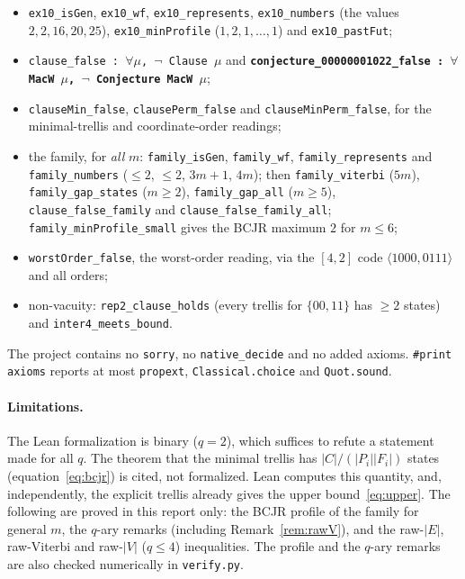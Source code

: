 \documentclass[11pt]{article}
\theoremstyle{definition}
\theoremstyle{remark}
\begin{document}
\begin{itemize}
\item \texttt{ex10\_isGen}, \texttt{ex10\_wf}, \texttt{ex10\_represents},
\texttt{ex10\_numbers} (the values $2,2,16,20,25$), \texttt{ex10\_minProfile}
($1,2,1,\dots,1$) and \texttt{ex10\_pastFut};
\item \texttt{clause\_false : $\forall\mu$, $\neg$ Clause $\mu$} and
\textbf{\texttt{conjecture\_00000001022\_false : $\forall$ MacW $\mu$, $\neg$ Conjecture MacW $\mu$}};
\item \texttt{clauseMin\_false}, \texttt{clausePerm\_false} and
\texttt{clauseMinPerm\_false}, for the minimal-trellis and coordinate-order readings;
\item the family, for \emph{all} $m$: \texttt{family\_isGen}, \texttt{family\_wf},
\texttt{family\_represents} and \texttt{family\_numbers}
($\le2$, $\le2$, $3m+1$, $4m$); then \texttt{family\_viterbi} ($5m$),
\texttt{family\_gap\_states} ($m\ge2$), \texttt{family\_gap\_all} ($m\ge5$),
\texttt{clause\_false\_family} and \texttt{clause\_false\_family\_all};
\texttt{family\_minProfile\_small} gives the BCJR maximum $2$ for $m\le6$;
\item \texttt{worstOrder\_false}, the worst-order reading, via the $[4,2]$ code
$\langle1000,0111\rangle$ and all orders;
\item non-vacuity: \texttt{rep2\_clause\_holds} (every trellis for $\{00,11\}$ has
$\ge2$ states) and \texttt{inter4\_meets\_bound}.
\end{itemize}
The project contains no \texttt{sorry}, no \texttt{native\_decide} and no added axioms.
\texttt{\#print axioms} reports at most \texttt{propext}, \texttt{Classical.choice} and
\texttt{Quot.sound}.

\paragraph{Limitations.} The Lean formalization is binary ($q=2$), which suffices to
refute a statement made for all $q$. The theorem that the minimal trellis has
$|C|/(|P_i||F_i|)$ states (equation~\eqref{eq:bcjr}) is cited, not formalized. Lean
computes this quantity, and, independently, the explicit trellis already gives the
upper bound~\eqref{eq:upper}. The following are proved in this report only: the BCJR profile
of the family for general $m$, the $q$-ary remarks (including Remark~\ref{rem:rawV}), and the
raw-$|E|$, raw-Viterbi and raw-$|V|$ ($q\le4$) inequalities. The profile and the $q$-ary remarks
are also checked numerically in \texttt{verify.py}.
\end{document}
